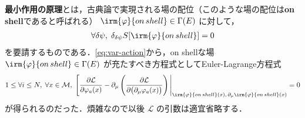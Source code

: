 \documentclass[TQFT_main]{subfiles}
\begin{document}
\textbf{最小作用の原理}とは，古典論で実現される場の配位（このような場の配位は\textbf{on shell}であると呼ばれる） $\irm{\varphi}{on\, shell} \in \Gamma(E)$ に対して，
\begin{align}
    \label{eq:LeastAction}
    \forall \delta\psi,\; \delta_{\delta \psi} S[\irm{\varphi}{on\, shell}] = 0
\end{align}
を要請するものである．\eqref{eq:var-action}から，on shellな場 $\irm{\varphi}{on\, shell} \in \Gamma(E)$ が充たすべき方程式としてEuler-Lagrange方程式
\begin{align}
    \label{eq:EL}
    1 \le \forall i \le N,\;\forall x \in \mathcal{M},\; \eval[\pdv{\mathcal{L}}{\varphi_a(x)} - \partial_\mu\left(\pdv{\mathcal{L}}{\bigl(\partial_\mu \varphi_a(x)\bigr)}\right)|_{\irm{\varphi}{on\, shell}(x),\, \partial_\mu \irm{\varphi}{on\, shell}(x)} = 0
\end{align}
が得られるのだった．煩雑なので以後 $\mathcal{L}$ の引数は適宜省略する．
\end{document}

